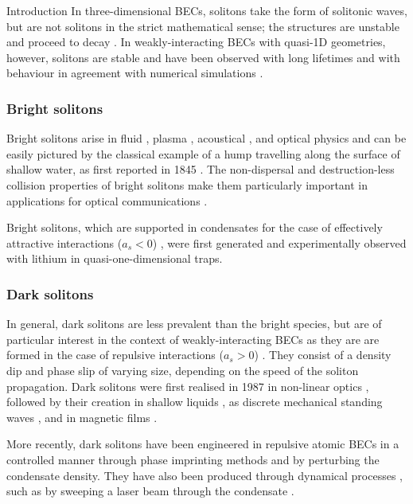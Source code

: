 \begin{chapter}{\label{cha:bose_gases}Introduction}
In three-dimensional BECs, solitons take the form of solitonic waves, but are not solitons in the strict mathematical sense; the structures are unstable and proceed to decay \cite{Burger99,PhysRevA.62.053606,PhysRevA.65.043612,Tikhonenko96}. In weakly-interacting BECs with quasi-1D geometries, however, solitons are stable and have been observed with long lifetimes and with behaviour in agreement with numerical simulations \cite{PhysRevLett.101.120406}.

\subsubsection{Bright solitons}
Bright solitons arise in fluid \cite{Russell45}, plasma \cite{PhysRevLett.37.693,PhysRevLett.33.886}, acoustical \cite{naugolnykh1998nonlinear}, and optical physics \cite{agrawal2001nonlinear} and can be easily pictured by the classical example of a hump travelling along the surface of shallow water, as first reported in 1845 \cite{Russell45}. The non-dispersal and destruction-less collision properties of bright solitons make them particularly important in applications for optical communications \cite{hasegawa1995solitons}.

Bright solitons, which are supported in condensates for the case of effectively attractive interactions ($a_s < 0$) \cite{PhysRevA.62.063611}, were first generated and experimentally observed with lithium \cite{Strecker02,Khaykovich1290} in quasi-one-dimensional traps.

\subsubsection{Dark solitons}
In general, dark solitons are less prevalent than the bright species, but are of particular interest in the context of weakly-interacting BECs as they are are formed in the case of repulsive interactions ($a_s > 0$) \cite{PhysRevA.62.063610}. They consist of a density dip and phase slip \cite{dodd1982solitons} of varying size, depending on the speed of the soliton propagation. Dark solitons were first realised in 1987 in non-linear optics \cite{Emplit87}, followed by their creation in shallow liquids \cite{PhysRevLett.64.1518}, as discrete mechanical standing waves \cite{PhysRevLett.68.1730}, and in magnetic films \cite{PhysRevLett.70.1707}.

More recently, dark solitons have been engineered in repulsive atomic BECs in a controlled manner through phase imprinting methods \cite{Denschlag97,Burger99,PhysRevLett.86.2926,PhysRevLett.101.120406} and by perturbing the condensate density. They have also been produced through dynamical processes \cite{Weller08,PhysRevLett.99.160405}, such as by sweeping a laser beam through the condensate \cite{PhysRevLett.99.160405}. 


\end{chapter}
